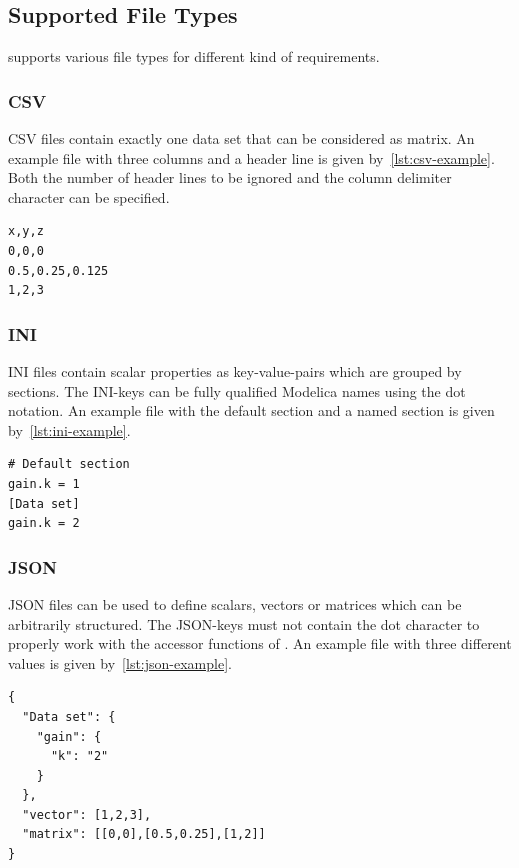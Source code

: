 \documentclass{modelica}
\newcommand{\modelica}[1]{\code{#1}}
\begin{document}
\subsection{Supported File Types}

\modelica{ExternData} supports various file types for different kind of requirements.

\subsubsection{CSV}

CSV files contain exactly one data set that can be considered as matrix.
An example file with three columns and a header line is given by~\autoref{lst:csv-example}.
Both the number of header lines to be ignored and the column delimiter character can be specified.

\begin{lstlisting}[caption=Example CSV file, label=lst:csv-example]
x,y,z
0,0,0
0.5,0.25,0.125
1,2,3
\end{lstlisting}

\subsubsection{INI}

INI files contain scalar properties as key-value-pairs which are grouped by sections.
The INI-keys can be fully qualified Modelica names using the dot notation.
An example file with the default section and a named section is given by~\autoref{lst:ini-example}.

\begin{lstlisting}[caption=Example INI file, label=lst:ini-example]
# Default section
gain.k = 1
[Data set]
gain.k = 2
\end{lstlisting}

\subsubsection{JSON}

JSON files can be used to define scalars, vectors or matrices which can be arbitrarily structured.
The JSON-keys must not contain the dot character to properly work with the accessor functions of \modelica{ExternData}.
An example file with three different values is given by~\autoref{lst:json-example}.

\begin{lstlisting}[caption=Example JSON file, label=lst:json-example]
{
  "Data set": {
    "gain": {
      "k": "2"
    }
  },
  "vector": [1,2,3],
  "matrix": [[0,0],[0.5,0.25],[1,2]]
}
\end{lstlisting}
\end{document}
